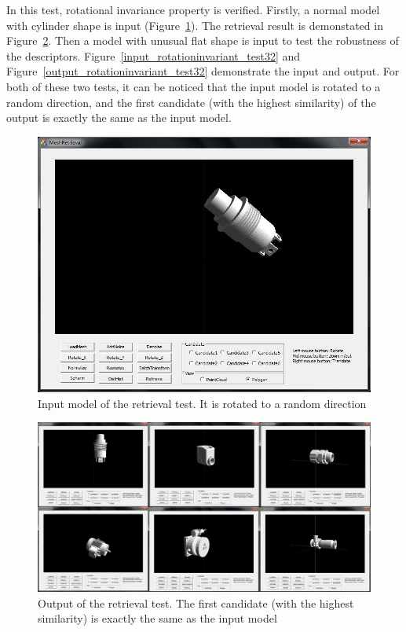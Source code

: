 \begin{enumerate}
In this test, rotational invariance property is verified. Firstly, a normal model with cylinder shape is input (Figure~\ref{input_rotationinvariant_test10}). The retrieval result is demonstated in Figure~\ref{output_rotationinvariant_test10}. Then a model with unusual flat shape is input to test the robustness of the descriptors. Figure~\ref{input_rotationinvariant_test32} and Figure~\ref{output_rotationinvariant_test32} demonstrate the input and output. For both of these two tests, it can be noticed that the input model is rotated to a random direction, and the first candidate (with the highest similarity) of the output is exactly the same as the input model. 

\begin{figure}[h]
\centering
\includegraphics[width=0.7\linewidth]{input_rotationinvariant_test10}
\caption{Input model of the retrieval test. It is rotated to a random direction} \label{input_rotationinvariant_test10}
\end{figure}

\begin{figure}[h]
\centering
\includegraphics[width=0.7\linewidth]{output_rotationinvariant_test10}
\caption{Output of the retrieval test. The first candidate (with the highest similarity) is exactly the same as the input model} \label{output_rotationinvariant_test10}
\end{figure}


\end{enumerate}

